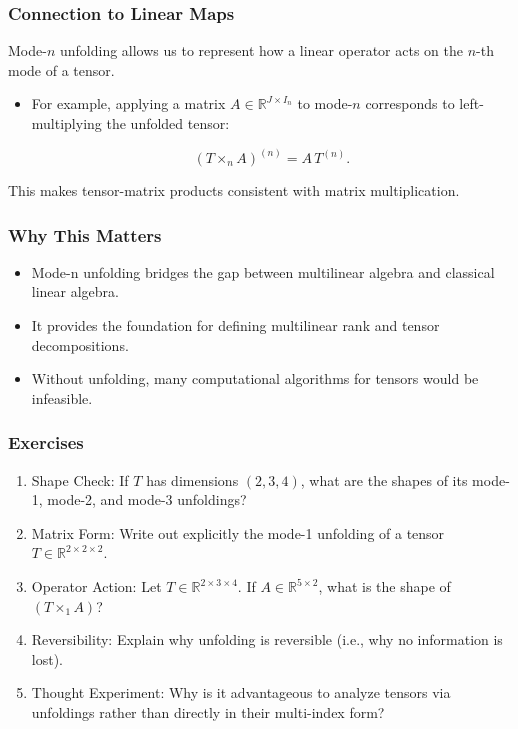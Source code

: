 \documentclass[
  letterpaper,
  DIV=11,
  numbers=noendperiod]{scrreprt}
\providecommand{\tightlist}{%
  \setlength{\itemsep}{0pt}\setlength{\parskip}{0pt}}
\begin{document}
\subsubsection{Connection to Linear
Maps}\label{connection-to-linear-maps}

Mode-\(n\) unfolding allows us to represent how a linear operator acts
on the \(n\)-th mode of a tensor.

\begin{itemize}
\item
  For example, applying a matrix \(A \in \mathbb{R}^{J \times I_n}\) to
  mode-\(n\) corresponds to left-multiplying the unfolded tensor:

  \[
  (T \times_n A)^{(n)} = A \, T^{(n)}.
  \]
\end{itemize}

This makes tensor-matrix products consistent with matrix multiplication.

\subsubsection{Why This Matters}\label{why-this-matters-27}

\begin{itemize}
\tightlist
\item
  Mode-n unfolding bridges the gap between multilinear algebra and
  classical linear algebra.
\item
  It provides the foundation for defining multilinear rank and tensor
  decompositions.
\item
  Without unfolding, many computational algorithms for tensors would be
  infeasible.
\end{itemize}

\subsubsection{Exercises}\label{exercises-40}

\begin{enumerate}
\def\labelenumi{\arabic{enumi}.}
\item
  Shape Check: If \(T\) has dimensions \((2,3,4)\), what are the shapes
  of its mode-1, mode-2, and mode-3 unfoldings?
\item
  Matrix Form: Write out explicitly the mode-1 unfolding of a tensor
  \(T \in \mathbb{R}^{2 \times 2 \times 2}\).
\item
  Operator Action: Let \(T \in \mathbb{R}^{2 \times 3 \times 4}\). If
  \(A \in \mathbb{R}^{5 \times 2}\), what is the shape of
  \((T \times_1 A)\)?
\item
  Reversibility: Explain why unfolding is reversible (i.e., why no
  information is lost).
\item
  Thought Experiment: Why is it advantageous to analyze tensors via
  unfoldings rather than directly in their multi-index form?
\end{enumerate}
\end{document}

